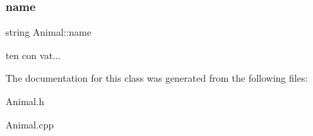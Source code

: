 \subsubsection{\texorpdfstring{name}{name}}
{\footnotesize\ttfamily string Animal\+::name\hspace{0.3cm}{\ttfamily [protected]}}

ten con vat... 

The documentation for this class was generated from the following files\+:\begin{DoxyCompactItemize}
\item 
Animal.\+h\item 
Animal.\+cpp\end{DoxyCompactItemize}
